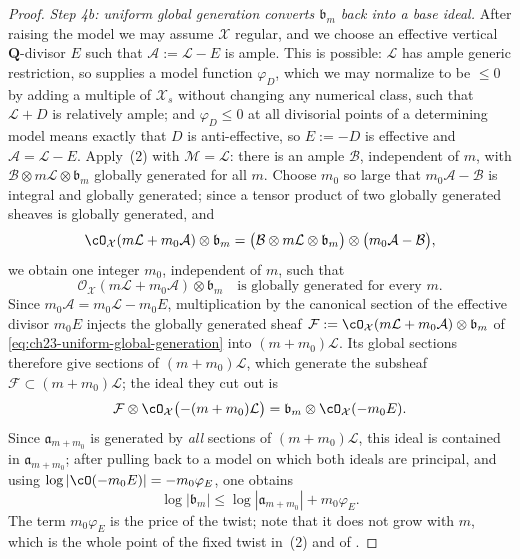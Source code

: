 \begin{proof}
\emph{Step 4b: uniform global generation converts \(\mathfrak b_m\) back
into a base ideal.}
After raising the model we may assume \(\mathcal X\) regular, and we choose
an effective vertical \(\mathbf Q\)-divisor \(E\) such that
\(\mathcal A:=\mathcal L-E\) is ample.  This is possible: \(\mathcal L\) has
ample generic restriction, so 
supplies a model function \(\varphi_D\), which we may normalize to be
\(\leq0\) by adding a multiple of \(\mathcal X_s\) without changing any
numerical class, such that \(\mathcal L+D\) is relatively ample; and
\(\varphi_D\leq0\) at all divisorial points of a determining model means
exactly that \(D\) is anti-effective, so \(E:=-D\) is effective and
\(\mathcal A=\mathcal L-E\).  Apply
\,(2) with
\(\mathcal M=\mathcal L\): there is an ample \(\mathcal B\), independent of
\(m\), with \(\mathcal B\otimes m\mathcal L\otimes\mathfrak b_m\) globally
generated for all \(m\).  Choose \(m_0\) so large that
\(m_0\mathcal A-\mathcal B\) is integral and globally generated; since a
tensor product of two globally generated sheaves is globally generated, and
\[
 \cO_{\mathcal X}(m\mathcal L+m_0\mathcal A)\otimes\mathfrak b_m
 =\bigl(\mathcal B\otimes m\mathcal L\otimes\mathfrak b_m\bigr)
  \otimes\bigl(m_0\mathcal A-\mathcal B\bigr),
\]
we obtain one integer \(m_0\), independent of \(m\), such that
\begin{equation}\label{eq:ch23-uniform-global-generation}
 \mathcal O_{\mathcal X}(m\mathcal L+m_0\mathcal A)
       \otimes\mathfrak b_m
 \quad\text{is globally generated for every }m.
\end{equation}
Since \(m_0\mathcal A=m_0\mathcal L-m_0E\), multiplication by the canonical
section of the effective divisor \(m_0E\) injects the globally generated
sheaf \(\mathcal F:=\cO_{\mathcal X}(m\mathcal L+m_0\mathcal A)\otimes
\mathfrak b_m\) of \eqref{eq:ch23-uniform-global-generation} into
\((m+m_0)\mathcal L\).  Its global sections therefore give sections of
\((m+m_0)\mathcal L\), which generate the subsheaf
\(\mathcal F\subset(m+m_0)\mathcal L\); the ideal they cut out is
\[
 \mathcal F\otimes\cO_{\mathcal X}\bigl(-(m+m_0)\mathcal L\bigr)
 =\mathfrak b_m\otimes\cO_{\mathcal X}(-m_0E) .
\]
Since \(\mathfrak a_{m+m_0}\) is generated by \emph{all} sections of
\((m+m_0)\mathcal L\), this ideal is contained in
\(\mathfrak a_{m+m_0}\); after pulling back to a model on which both ideals
are principal, and using
\(\log|\cO(-m_0E)|=-m_0\varphi_E\), one obtains
\begin{equation}\label{eq:ch23-global-generation-comparison}
 \log|\mathfrak b_m|
       \leq\log|\mathfrak a_{m+m_0}|+m_0\varphi_E .
\end{equation}
The term \(m_0\varphi_E\) is the price of the twist; note that it does not
grow with \(m\), which is the whole point of the fixed twist in
\,(2) and of
.


\end{proof}
